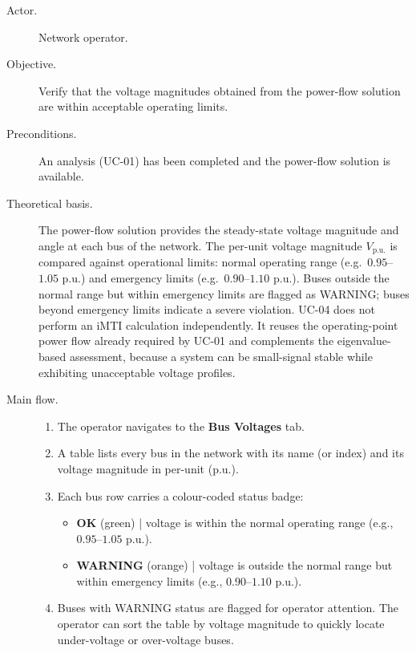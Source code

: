 \begin{description}
  \item[Actor.] Network operator.
  \item[Objective.] Verify that the voltage magnitudes obtained from the power-flow solution are within acceptable operating limits.
  \item[Preconditions.] An analysis (UC-01) has been completed and the power-flow solution is available.
  \item[Theoretical basis.] The power-flow solution provides the steady-state voltage magnitude and angle at each bus of the network. The per-unit voltage magnitude $V_\mathrm{p.u.}$ is compared against operational limits: normal operating range (e.g.\ $0.95$--$1.05$ p.u.) and emergency limits (e.g.\ $0.90$--$1.10$ p.u.). Buses outside the normal range but within emergency limits are flagged as WARNING; buses beyond emergency limits indicate a severe violation. UC-04 does not perform an iMTI calculation independently. It reuses the operating-point power flow already required by UC-01 and complements the eigenvalue-based assessment, because a system can be small-signal stable while exhibiting unacceptable voltage profiles.
  \item[Main flow.]
        \begin{enumerate}[before=\leavevmode, leftmargin=*]
          \item The operator navigates to the \textbf{Bus Voltages} tab.
          \item A table lists every bus in the network with its name (or index) and its voltage magnitude in per-unit (p.u.).
          \item Each bus row carries a colour-coded status badge:
                \begin{itemize}[before=\leavevmode, leftmargin=*]
                  \item \textbf{OK} (green) | voltage is within the normal operating range (e.g., $0.95$--$1.05$ p.u.).
                  \item \textbf{WARNING} (orange) | voltage is outside the normal range but within emergency limits (e.g., $0.90$--$1.10$ p.u.).
                \end{itemize}
          \item Buses with WARNING status are flagged for operator attention. The operator can sort the table by voltage magnitude to quickly locate under-voltage or over-voltage buses.
        \end{enumerate}


\end{description}
